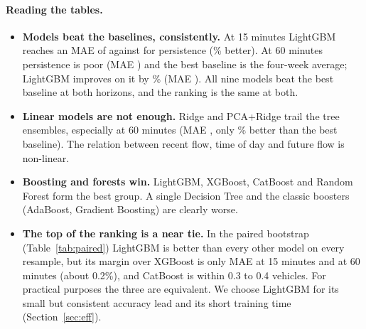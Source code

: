 \documentclass[11pt,a4paper]{article}
\begin{document}
\paragraph{Reading the tables.}
\begin{itemize}
\item \textbf{Models beat the baselines, consistently.} At 15 minutes LightGBM reaches an MAE of \lgbmMAEFifteen{} against \persMAEFifteen{} for persistence (\lgbmSkillFifteen\% better). At 60 minutes persistence is poor (MAE \persMAESixty{}) and the
best baseline is the four-week average; LightGBM improves on it by \lgbmSkillSixty\% (MAE \lgbmMAESixty{}). All nine models beat the best baseline at both horizons, and the ranking is the same at both.
\item \textbf{Linear models are not enough.} Ridge and PCA+Ridge trail the tree ensembles, especially at 60 minutes (MAE \ridgeMAESixty{}, only \ridgeSkillSixty\% better than the best baseline).
The relation between recent flow, time of day and future flow is non-linear.
\item \textbf{Boosting and forests win.} LightGBM, XGBoost, CatBoost and Random Forest form the best group. A single Decision Tree and the classic boosters (AdaBoost, Gradient Boosting) are clearly worse.
\item \textbf{The top of the ranking is a near tie.} In the paired bootstrap (Table~\ref{tab:paired}) LightGBM is better than every other model on every resample, but its margin over XGBoost is only \xgbGapFifteen{} MAE at 15 minutes and \xgbGapSixty{}
at 60 minutes (about 0.2\%), and CatBoost is within 0.3 to 0.4 vehicles. For practical purposes the three are equivalent. We choose LightGBM for its small but consistent accuracy lead and its short training time (Section~\ref{sec:eff}).
\end{itemize}

\begin{table}[H]\centering\small

\caption{Paired day-block bootstrap on the test year: MAE of the other model minus MAE of LightGBM (positive = LightGBM better), with its 95\% interval and the share of the 1{,}000 resamples in which LightGBM is better. The interval reflects
variation between days, not training randomness (three LightGBM seeds differ by a standard deviation of 0.02 MAE).}\label{tab:paired}
\end{table}
\end{document}
